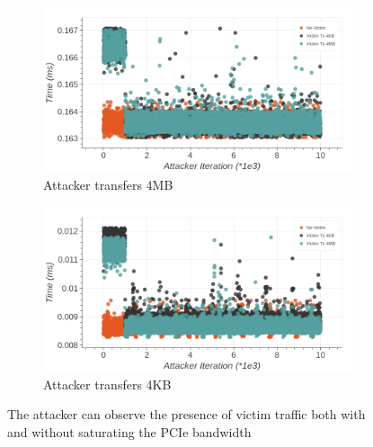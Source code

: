 \begin{figure}
     \centering
     
     \begin{subfigure}[b]{\textwidth}
         \centering
        \includegraphics[width=\textwidth]{figures/interconnect-sc/dma/dma_contention_4MB.png}
        \caption{Attacker transfers 4MB}
        \label{fig:dma-contention-4mb}
     \end{subfigure}

    \hfill
     
     \begin{subfigure}[b]{\textwidth}
        \centering
        \includegraphics[width=\textwidth]{figures/interconnect-sc/dma/dma_contention_4KB.png}
        \caption{Attacker transfers 4KB}
        \label{fig:dma-contention-4kb}
     \end{subfigure}

     \caption{The attacker can observe the presence of victim traffic both with and without saturating the PCIe bandwidth}
    \label{fig:dma-contention}
\end{figure}

